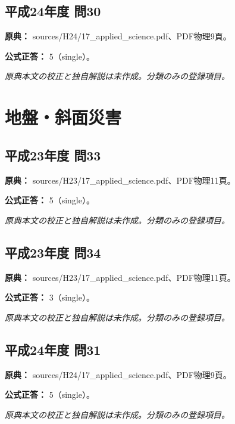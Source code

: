\subsection{平成24年度 問30}
\label{q:h24-reg-applied-30}

\noindent\textbf{原典：} sources/H24/17\_applied\_science.pdf、PDF物理9頁。

\textbf{公式正答：} 5（single）。

\par\textit{原典本文の校正と独自解説は未作成。分類のみの登録項目。}

\section{地盤・斜面災害}

\subsection{平成23年度 問33}
\label{q:h23-reg-applied-33}

\noindent\textbf{原典：} sources/H23/17\_applied\_science.pdf、PDF物理11頁。

\textbf{公式正答：} 5（single）。

\par\textit{原典本文の校正と独自解説は未作成。分類のみの登録項目。}

\subsection{平成23年度 問34}
\label{q:h23-reg-applied-34}

\noindent\textbf{原典：} sources/H23/17\_applied\_science.pdf、PDF物理11頁。

\textbf{公式正答：} 3（single）。

\par\textit{原典本文の校正と独自解説は未作成。分類のみの登録項目。}

\subsection{平成24年度 問31}
\label{q:h24-reg-applied-31}

\noindent\textbf{原典：} sources/H24/17\_applied\_science.pdf、PDF物理9頁。

\textbf{公式正答：} 5（single）。

\par\textit{原典本文の校正と独自解説は未作成。分類のみの登録項目。}

